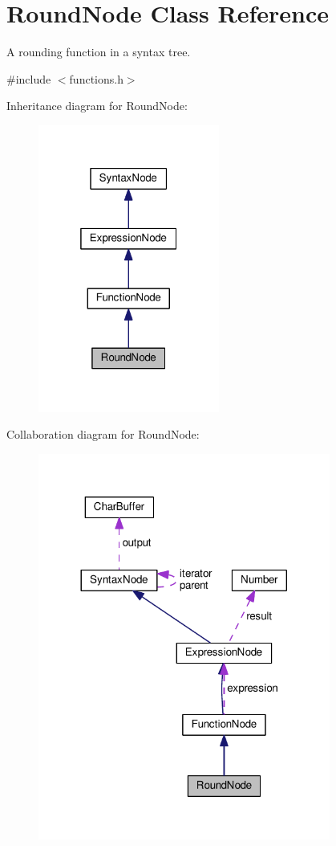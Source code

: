 \hypertarget{classRoundNode}{}\section{Round\+Node Class Reference}
\label{classRoundNode}


A rounding function in a syntax tree.  




{\ttfamily \#include $<$functions.\+h$>$}



Inheritance diagram for Round\+Node\+:
\nopagebreak
\begin{figure}[H]
\begin{center}
\leavevmode
\includegraphics[width=169pt]{d0/d4b/classRoundNode__inherit__graph}
\end{center}
\end{figure}


Collaboration diagram for Round\+Node\+:
\nopagebreak
\begin{figure}[H]
\begin{center}
\leavevmode
\includegraphics[width=272pt]{dc/d4b/classRoundNode__coll__graph}
\end{center}
\end{figure}

